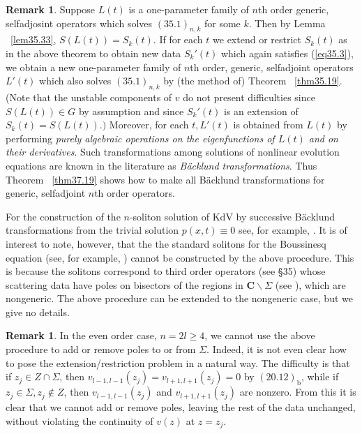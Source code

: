 \documentclass{surv-l}
\theoremstyle{plain}
\theoremstyle{definition}
\newtheorem{remark}[theorem]{Remark}
\numberwithin{equation}{chapter}
\begin{document}
\begin{remark}\label{rem37.50}
Suppose $L(t)$ is a one-parameter family of $n$th order generic, selfadjosint operators which solves $\mathrm{(35.1)}_{n,k}$ for some $k$. Then by Lemma ~\ref{lem35.33}, $S(L(t))=S_{k}(t)$. If for each $t$ we extend or restrict $S_{k}(t)$ as in the above theorem to obtain new data $S_{k}'(t)$ which again satisfies (\ref{eq35.3}), we obtain a new one-parameter family of $n$th order, generic, selfadjoint operators $L'(t)$ which also solves $\mathrm{(35.1)}_{n,k}$ by (the method of) Theorem ~\ref{thm35.19}. (Note that the unstable components of $v$ do not present difficulties since $S(L(t))\in G$ by assumption and since $S_{k}'(t)$ is an extension of $S_{k}(t)=S(L(t)).)$ Moreover, for each $t, L'(t)$ is obtained from $L(t)$ by performing \emph{purely algebraic operations on the eigenfunctions of $L(t)$ and on their derivatives}. Such transformations among solutions of nonlinear evolution equations are known in the literature as \emph{B\"{a}cklund transformations}. Thus Theorem ~\ref{thm37.19} shows how to make all B\"{a}cklund transformations for generic, selfadjoint $n$th order operators.
\end{remark}

For the construction of the $n$-soliton solution of KdV by successive B\"{a}cklund transformations from the trivial solution $p(x, t)\equiv 0$ see, for example, \cite{DT}. It is of interest to note, however, that the the standard solitons for the Boussinesq equation (see, for example, \cite{SCM}) cannot be constructed by the above procedure. This is because the solitons correspond to third order operators (see \S35) whose scattering data have poles on bisectors of the regions in $ \mathrm{\textbf{C}}\backslash \Sigma$ (see \cite{DTT}), which are nongeneric. The above procedure can be extended to the nongeneric case, but we give no details.

\begin{remark}\label{rem37.51}
In the even order case, $n=2l\geq 4$, we cannot use the above procedure to add or remove poles to or from $\Sigma$. Indeed, it is not even clear how to pose the extension/restriction problem in a natural way. The difficulty is that if $ z_{j}\in Z\cap\Sigma$, then $v_{l-1,l-1}(z_{j})=v_{l+1,l+1}(z_{j})=0$ by $\mathrm{(20.12)_{b}}$, while if $ z_{j}\in\Sigma, z_{j}\not\in Z$, then $v_{l-1,l-1}(z_{j})$ and $v_{l+1,l+1}(z_{j})$ are nonzero. From this it is clear that we cannot add or remove poles, leaving the rest of the data unchanged, without violating the continuity of $v(z)$ at $z=z_{j}$.
\end{remark}
\end{document}
